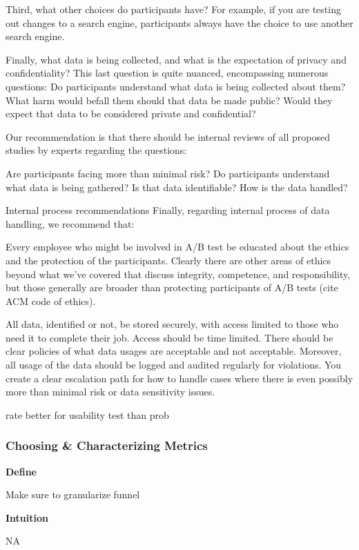 \documentclass[]{book}
\theoremstyle{definition}
\theoremstyle{definition}
\theoremstyle{definition}
\theoremstyle{remark}
\begin{document}
Third, what other choices do participants have? For example, if you are
testing out changes to a search engine, participants always have the
choice to use another search engine.

Finally, what data is being collected, and what is the expectation of
privacy and confidentiality? This last question is quite nuanced,
encompassing numerous questions: Do participants understand what data is
being collected about them? What harm would befall them should that data
be made public? Would they expect that data to be considered private and
confidential?

Our recommendation is that there should be internal reviews of all
proposed studies by experts regarding the questions:

Are participants facing more than minimal risk? Do participants
understand what data is being gathered? Is that data identifiable? How
is the data handled?

Internal process recommendations Finally, regarding internal process of
data handling, we recommend that:

Every employee who might be involved in A/B test be educated about the
ethics and the protection of the participants. Clearly there are other
areas of ethics beyond what we've covered that discuss integrity,
competence, and responsibility, but those generally are broader than
protecting participants of A/B tests (cite ACM code of ethics).

All data, identified or not, be stored securely, with access limited to
those who need it to complete their job. Access should be time limited.
There should be clear policies of what data usages are acceptable and
not acceptable. Moreover, all usage of the data should be logged and
audited regularly for violations. You create a clear escalation path for
how to handle cases where there is even possibly more than minimal risk
or data sensitivity issues.

rate better for usability test than prob

\subsubsection{Choosing \& Characterizing
Metrics}\label{choosing-characterizing-metrics}

\textbf{Define}

Make sure to granularize funnel

\textbf{Intuition}

NA
\end{document}
